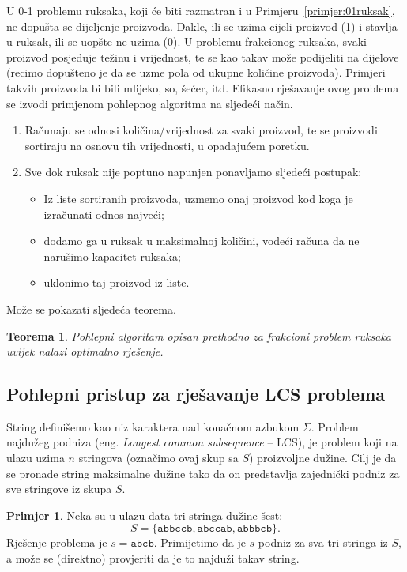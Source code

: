 \documentclass[a4paper, utf8, 11pt, colorlinks]{book}
\newtheorem{thm}{Teorema}[chapter]
\theoremstyle{definition}
\newtheorem{primjer}{Primjer}[chapter]
\begin{document}
U 0-1 problemu ruksaka, koji će biti razmatran i u Primjeru~\ref{primjer:01ruksak},  ne dopušta se dijeljenje proizvoda. Dakle, ili se uzima cijeli proizvod (1) i stavlja u ruksak, ili se uopšte ne uzima (0). U  problemu frakcionog ruksaka, svaki proizvod posjeduje težinu i vrijednost, te se kao takav može podijeliti na dijelove (recimo dopušteno je da se uzme   pola od ukupne količine proizvoda). Primjeri takvih proizvoda bi bili mlijeko, so, šećer, itd. Efikasno rješavanje ovog problema se izvodi primjenom pohlepnog algoritma na sljedeći način.
\begin{enumerate}
	\item Računaju se odnosi količina/vrijednost za svaki proizvod, te se proizvodi  sortiraju na osnovu tih vrijednosti, u opadajućem poretku. 
	   \item Sve dok ruksak nije poptuno napunjen ponavljamo sljedeći postupak:
	   	\begin{itemize}
	   		\item  Iz liste sortiranih proizvoda, uzmemo onaj proizvod kod koga je izračunati odnos najveći;
	   		\item  dodamo  ga u ruksak u maksimalnoj količini, vodeći računa da ne narušimo kapacitet ruksaka;
	   		\item uklonimo taj proizvod iz liste.
	   	\end{itemize} 
	   
\end{enumerate}
Može se pokazati sljedeća teorema. 

\begin{thm}
      Pohlepni algoritam opisan prethodno za frakcioni problem ruksaka uvijek nalazi optimalno rješenje.
\end{thm}
\subsection{Pohlepni pristup za rješavanje LCS problema}

String definišemo kao niz karaktera nad konačnom azbukom $\Sigma$. 
Problem najdužeg podniza (eng. \emph{Longest common subsequence} -- LCS), je problem koji na ulazu uzima  $n$ stringova (označimo ovaj skup sa $S$) proizvoljne dužine. Cilj je da se pronađe string maksimalne dužine tako da on predstavlja zajednički podniz za sve stringove iz skupa $S$. 

\begin{primjer}\label{primjer:lcs}
 Neka su u ulazu data tri stringa dužine šest: $$S = \{  \texttt{abbccb}, \texttt{abccab}, \texttt{abbbcb}   \}.$$  Rješenje problema je $s=\texttt{abcb}$. Primijetimo da je $s$ podniz za sva tri stringa iz $S$, a može se (direktno) provjeriti da je to najduži takav string. 
 \end{primjer}
 
\end{document}

